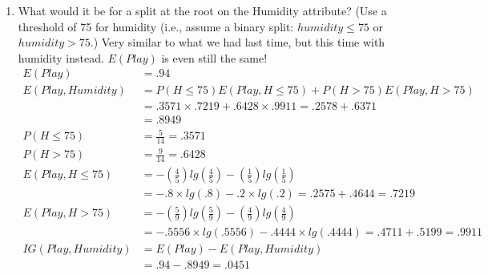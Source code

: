 \documentclass[12pt]{article}
\begin{document}
\begin{enumerate}
\begin{enumerate}
\newpage
\item What would it be for a split at the root on the Humidity attribute? (Use a threshold of 75 for humidity (i.e., assume a binary split: $humidity \leq 75$ or $humidity > 75$.)
Very similar to what we had last time, but this time with humidity instead. $E(Play)$ is even still the same!\\
\begin{align*}
E(Play) &= .94\\
E(Play, Humidity) &= P(H \leq 75)E(Play, H \leq 75) + P(H > 75)E(Play, H > 75)\\
&= .3571 \times .7219 + .6428 \times .9911 = .2578 + .6371\\
&= .8949\\
P(H \leq 75) &= \frac{5}{14} = .3571\\
P(H > 75) &= \frac{9}{14} = .6428\\
E(Play, H \leq 75) &= - (\frac{4}{5})lg(\frac{4}{5}) - (\frac{1}{5})lg(\frac{1}{5})\\
&= - .8 \times lg(.8) - .2 \times lg(.2)
= .2575 + .4644 = .7219\\
E(Play, H > 75) &= - (\frac{5}{9})lg(\frac{5}{9}) - (\frac{4}{9})lg(\frac{4}{9})\\
&= - .5556 \times lg(.5556) - .4444 \times lg(.4444)
= .4711 + .5199 = .9911\\
IG(Play, Humidity) &= E(Play) - E(Play, Humidity)\\
&= .94 - .8949 = \boxed{.0451}
\end{align*}

\end{enumerate}
\newpage

\end{enumerate}
\end{document}
